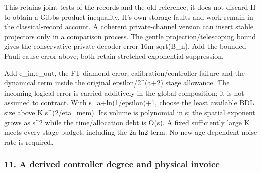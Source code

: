 \documentclass[
]{article}
\begin{document}
This retains joint tests of the records and the old reference; it does
not discard H to obtain a Gibbs product inequality. H's own storage
faults and work remain in the classical-record account. A coherent
private-channel version can insert stable projectors only in a
comparison process. The gentle
p\allowbreak{}r\allowbreak{}o\allowbreak{}j\allowbreak{}e\allowbreak{}c\allowbreak{}t\allowbreak{}i\allowbreak{}o\allowbreak{}n\allowbreak{}/\allowbreak{}t\allowbreak{}e\allowbreak{}l\allowbreak{}e\allowbreak{}s\allowbreak{}c\allowbreak{}o\allowbreak{}p\allowbreak{}i\allowbreak{}n\allowbreak{}g
bound gives the conservative private-decoder error 16m sqrt(B\_n). Add
the bounded Pauli-cause error above; both retain stretched-exponential
suppression.

Add e\_in,e\_out, the FT diamond error,
c\allowbreak{}a\allowbreak{}l\allowbreak{}i\allowbreak{}b\allowbreak{}r\allowbreak{}a\allowbreak{}t\allowbreak{}i\allowbreak{}o\allowbreak{}n\allowbreak{}/\allowbreak{}c\allowbreak{}o\allowbreak{}n\allowbreak{}t\allowbreak{}r\allowbreak{}o\allowbreak{}l\allowbreak{}l\allowbreak{}e\allowbreak{}r
failure and the dynamical term inside the original
e\allowbreak{}p\allowbreak{}s\allowbreak{}i\allowbreak{}l\allowbreak{}o\allowbreak{}n\allowbreak{}/\allowbreak{}2\allowbreak{}\^{}\allowbreak{}(\allowbreak{}a\allowbreak{}+\allowbreak{}2\allowbreak{})
stage allowance. The incoming logical error is carried additively in the
global composition; it is not assumed to contract. With
s\allowbreak{}=\allowbreak{}a\allowbreak{}+\allowbreak{}l\allowbreak{}n\allowbreak{}(\allowbreak{}1\allowbreak{}/\allowbreak{}e\allowbreak{}p\allowbreak{}s\allowbreak{}i\allowbreak{}l\allowbreak{}o\allowbreak{}n\allowbreak{})\allowbreak{}+\allowbreak{}1\allowbreak{},
choose the least available BDL size above K s\^{}(2/eta\_mem). Its
volume is polynomial in s; the spatial exponent grows as s\^{}2 while
the
t\allowbreak{}i\allowbreak{}m\allowbreak{}e\allowbreak{}/\allowbreak{}a\allowbreak{}l\allowbreak{}l\allowbreak{}o\allowbreak{}c\allowbreak{}a\allowbreak{}t\allowbreak{}i\allowbreak{}o\allowbreak{}n
debt is O(s). A fixed sufficiently large K meets every stage budget,
including the 2a ln2 term. No new age-dependent noise rate is required.

\subsubsection{11. A derived controller degree and physical
invoice}\label{a-derived-controller-degree-and-physical-invoice}
\end{document}
